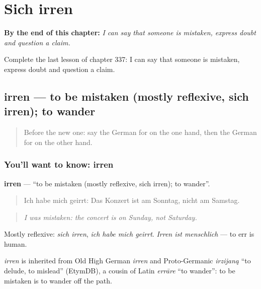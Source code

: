 
\chapter{Sich irren}
\label{ch:ge-sich-irren}

\begin{chapteropening}
\textbf{By the end of this chapter:} \emph{I can say that someone is mistaken, express doubt and question a claim.}

Complete the last lesson of chapter 337: I can say that someone is mistaken, express doubt and question a claim.
\end{chapteropening}

\section[irren]{irren — to be mistaken (mostly reflexive, sich irren); to wander}

\label{lesson:GE-C337-irren}



\begin{quote}
Before the new one: say the German for on the one hand, then the German for on the other hand.
\end{quote}

\subsection*{You'll want to know: irren}
\textbf{irren} — \textquotedblleft{}to be mistaken (mostly reflexive, sich irren); to wander\textquotedblright{}.

\begin{quote}
Ich habe mich geirrt: Das Konzert ist am Sonntag, nicht am Samstag.
\end{quote}

\begin{quote}
\emph{I was mistaken: the concert is on Sunday, not Saturday.}
\end{quote}

Mostly reflexive: \emph{sich irren}, \emph{ich habe mich geirrt}. \emph{Irren ist menschlich} — to err is human.

\begin{cousinweb}
\emph{irren} is inherited from Old High German \emph{irren} and Proto-Germanic \emph{irzijaną} \textquotedblleft{}to delude, to mislead\textquotedblright{} (EtymDB), a cousin of Latin \emph{errāre} \textquotedblleft{}to wander\textquotedblright{}: to be mistaken is to wander off the path.
\end{cousinweb}


